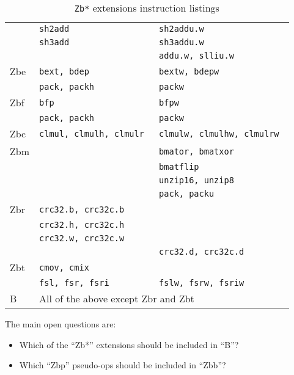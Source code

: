\begin{table}[!h]
\begin{center}
\begin{tabular}{lll}
 & {\tt sh2add                    } & {\tt sh2addu.w                 } \\
 & {\tt sh3add                    } & {\tt sh3addu.w                 } \\
 & {\tt                           } & {\tt addu.w, slliu.w           } \\
\hline
Zbe
 & {\tt bext, bdep                } & {\tt bextw, bdepw              } \\
 & {\tt pack, packh               } & {\tt packw                     } \\
\hline
Zbf
 & {\tt bfp                       } & {\tt bfpw                      } \\
 & {\tt pack, packh               } & {\tt packw                     } \\
\hline
Zbc
 & {\tt clmul, clmulh, clmulr     } & {\tt clmulw, clmulhw, clmulrw  } \\
\hline
Zbm
 & {\tt                           } & {\tt bmator, bmatxor           } \\
 & {\tt                           } & {\tt bmatflip                  } \\
 & {\tt                           } & {\tt unzip16, unzip8           } \\
 & {\tt                           } & {\tt pack, packu               } \\
\hline
Zbr
 & {\tt crc32.b, crc32c.b         } & {\tt                           } \\
 & {\tt crc32.h, crc32c.h         } & {\tt                           } \\
 & {\tt crc32.w, crc32c.w         } & {\tt                           } \\
 & {\tt                           } & {\tt crc32.d, crc32c.d         } \\
\hline
Zbt
 & {\tt cmov, cmix                } & {\tt                           } \\
 & {\tt fsl, fsr, fsri            } & {\tt fslw, fsrw, fsriw         } \\
\hline
B
 & \multicolumn{2}{l}{All of the above except Zbr and Zbt} \\
\end{tabular}
\caption{{\tt Zb*} extensions instruction listings}
\end{center}
\label{zbexts}
\end{table}

The main open questions are:
\begin{itemize}
\item Which of the ``Zb*'' extensions should be included in ``B''?
\item Which ``Zbp'' pseudo-ops should be included in ``Zbb''?
\end{itemize}

